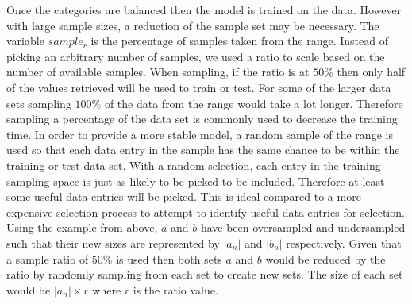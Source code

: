 Once the categories are balanced then the model is trained on the data. However with large sample sizes, a reduction of the sample set may be necessary. The variable $sample_r$ is the percentage of samples taken from the range. Instead of picking an arbitrary number of samples, we used a ratio to scale based on the number of available samples. When sampling, if the ratio is at $50\%$ then only half of the values retrieved will be used to train or test. For some of the larger data sets sampling $100\%$ of the data from the range would take a lot longer. Therefore sampling a percentage of the data set is commonly used to decrease the training time. In order to provide a more stable model, a random sample of the range is used so that each data entry in the sample has the same chance to be within the training or test data set. With a random selection, each entry in the training sampling space is just as likely to be picked to be included. Therefore at least some useful data entries will be picked. This is ideal compared to a more expensive selection process to attempt to identify useful data entries for selection. Using the example from above, $a$ and $b$ have been oversampled and undersampled such that their new sizes are represented by $|a_n|$ and $|b_n|$ respectively. Given that a sample ratio of $50\%$ is used then both sets $a$ and $b$ would be reduced by the ratio by randomly sampling from each set to create new sets. The size of each set would be $|a_n| \times r$ where $r$ is the ratio value.

%

